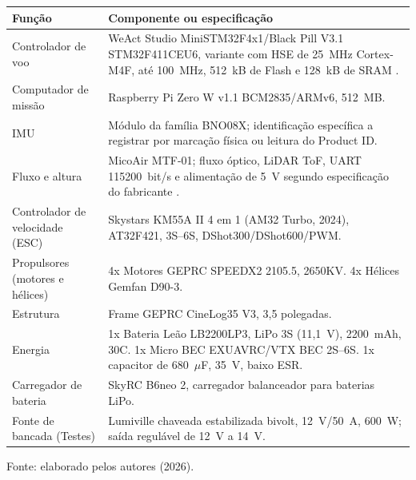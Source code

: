 \begin{quadro}[htb]
\centering
\caption{Componentes da plataforma experimental.}
\label{qua:componentes}
\small
\renewcommand{\arraystretch}{1.3}
\begin{tabular}{
  |
  >{\raggedright\arraybackslash}p{3.2cm}
  |
  >{\raggedright\arraybackslash}p{10.8cm}
  |
}
\hline
\textbf{Função} & \textbf{Componente ou especificação} \\
\hline

Controlador de voo &
WeAct Studio MiniSTM32F4x1/Black Pill V3.1\newline
STM32F411CEU6, variante com HSE de 25~MHz\newline
Cortex-M4F, até 100~MHz, 512~kB de Flash e 128~kB de SRAM \cite{stm32f411ds}. \\[4pt]
\hline

Computador de missão &
Raspberry Pi Zero W v1.1\newline
BCM2835/ARMv6, 512~MB. \\[4pt]
\hline

IMU &
Módulo da família BNO08X; identificação específica a registrar por marcação física ou leitura do Product ID. \\[4pt]
\hline

Fluxo e altura &
MicoAir MTF-01; fluxo óptico, LiDAR ToF, UART 115200~bit/s e alimentação de 5~V segundo especificação do fabricante \cite{micoairmtf01}. \\[4pt]
\hline

Controlador de velocidade (ESC) &
Skystars KM55A II 4 em 1 (AM32 Turbo, 2024), AT32F421, 3S--6S, DShot300/DShot600/PWM. \\[4pt]
\hline

Propulsores (motores e hélices) &
4x Motores GEPRC SPEEDX2 2105.5, 2650KV. \newline
4x Hélices Gemfan D90-3. \\[4pt]
\hline

Estrutura &
Frame GEPRC CineLog35 V3, 3,5 polegadas. \\[4pt]
\hline

Energia &
1x Bateria Leão LB2200LP3, LiPo 3S (11,1~V), 2200~mAh, 30C.\newline
1x Micro BEC EXUAVRC/VTX BEC 2S--6S.\newline
1x capacitor de 680~$\mu$F, 35~V, baixo ESR. \\[4pt]
\hline

Carregador de bateria &
SkyRC B6neo 2, carregador balanceador para baterias LiPo. \\[4pt]
\hline

Fonte de bancada (Testes) &
Lumiville chaveada estabilizada bivolt, 12~V/50~A, 600~W; saída regulável de 12~V a 14~V. \\
\hline
\end{tabular}
\par\vspace{0.2cm}
\footnotesize Fonte: elaborado pelos autores (2026).
\end{quadro}

